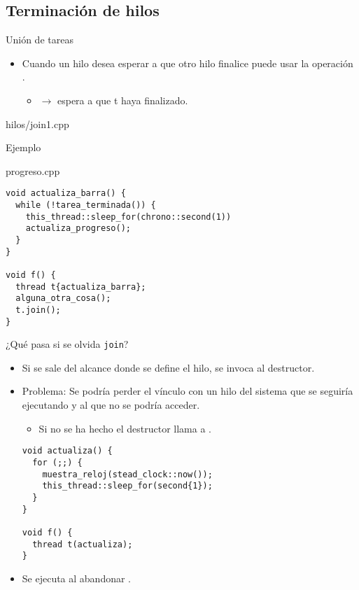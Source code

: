 \subsection{Terminación de hilos}

\begin{frame}[fragile]{Unión de tareas}
\begin{itemize}
  \item Cuando un hilo desea esperar a que otro hilo finalice puede usar la operación .
    \begin{itemize}
      \item {} $\rightarrow$ espera a que t haya finalizado.
    \end{itemize}
\end{itemize}
\begin{block}{hilos/join1.cpp}

\end{block}
\end{frame}

\begin{frame}[fragile]{Ejemplo}
\begin{block}{progreso.cpp}
\begin{lstlisting}
void actualiza_barra() {
  while (!tarea_terminada()) {
    this_thread::sleep_for(chrono::second(1))
    actualiza_progreso();
  }
}

void f() {
  thread t{actualiza_barra};
  alguna_otra_cosa();
  t.join();
}
\end{lstlisting}
\end{block}
\end{frame}

\begin{frame}[fragile]{¿Qué pasa si se olvida \texttt{join}?}
\begin{itemize}
  \item Si se sale del alcance donde se define el hilo, se invoca al destructor.
  \item \alert{Problema}: Se podría perder el vínculo con un hilo del sistema que se seguiría
        ejecutando y al que no se podría acceder.
    \begin{itemize}
      \item Si no se ha hecho  el destructor llama a .
    \end{itemize}
\begin{lstlisting}
void actualiza() {
  for (;;) {
    muestra_reloj(stead_clock::now());
    this_thread::sleep_for(second{1});
  }
}

void f() {
  thread t(actualiza);
}
\end{lstlisting}
  \item Se ejecuta  al abandonar .
\end{itemize}
\end{frame}

